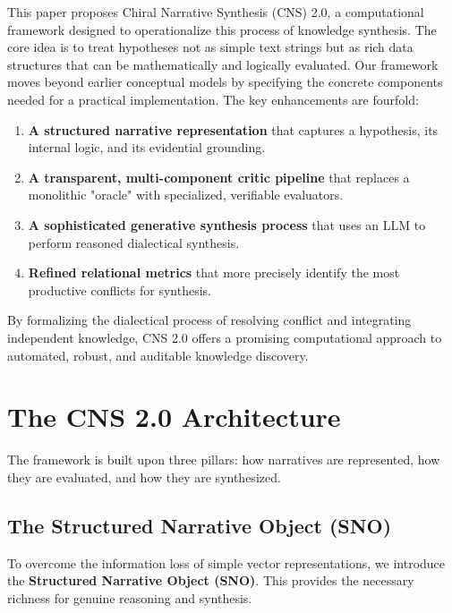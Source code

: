 \documentclass[12pt, a4paper]{article}
\begin{document}
This paper proposes Chiral Narrative Synthesis (CNS) 2.0, a computational framework designed to operationalize this process of knowledge synthesis. The core idea is to treat hypotheses not as simple text strings but as rich data structures that can be mathematically and logically evaluated. Our framework moves beyond earlier conceptual models by specifying the concrete components needed for a practical implementation. The key enhancements are fourfold:
\begin{enumerate}
    \item \textbf{A structured narrative representation} that captures a hypothesis, its internal logic, and its evidential grounding.
    \item \textbf{A transparent, multi-component critic pipeline} that replaces a monolithic "oracle" with specialized, verifiable evaluators.
    \item \textbf{A sophisticated generative synthesis process} that uses an LLM to perform reasoned dialectical synthesis.
    \item \textbf{Refined relational metrics} that more precisely identify the most productive conflicts for synthesis.
\end{enumerate}

By formalizing the dialectical process of resolving conflict and integrating independent knowledge, CNS 2.0 offers a promising computational approach to automated, robust, and auditable knowledge discovery.

\section{The CNS 2.0 Architecture}
The framework is built upon three pillars: how narratives are represented, how they are evaluated, and how they are synthesized.

\subsection{The Structured Narrative Object (SNO)}
To overcome the information loss of simple vector representations, we introduce the \textbf{Structured Narrative Object (SNO)}. This provides the necessary richness for genuine reasoning and synthesis.
\end{document}
